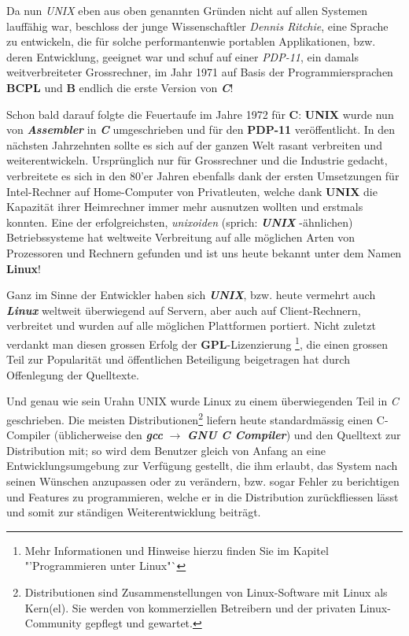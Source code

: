 \documentclass[a4paper,10pt,dvips,fleqn,titlepage,twoside]{book}
\begin{document}
Da nun \emph{UNIX} eben aus oben genannten Gründen nicht auf allen Systemen lauffähig war, beschloss der junge Wissenschaftler \emph{Dennis Ritchie}, eine Sprache zu entwickeln, die für solche performantenwie portablen Applikationen, bzw. deren Entwicklung, geeignet war und schuf auf einer \emph{PDP-11}, ein damals weitverbreiteter Grossrechner, im Jahr 1971 auf Basis der Programmiersprachen \textbf{BCPL} und \textbf{B} endlich die erste Version von \emph{\textbf{C}}!

Schon bald darauf folgte die Feuertaufe im Jahre 1972 für \textbf{C}: \textbf{UNIX} wurde nun von \emph{\textbf{Assembler}} in \emph{\textbf{C}} umgeschrieben und für den \textbf{PDP-11} veröffentlicht.\newline
In den nächsten Jahrzehnten sollte es sich auf der ganzen Welt rasant verbreiten und weiterentwickeln. Ursprünglich nur für Grossrechner und die Industrie gedacht, verbreitete es sich in den 80'er Jahren ebenfalls dank der ersten Umsetzungen für Intel-Rechner auf Home-Computer von Privatleuten, welche dank \textbf{UNIX} die Kapazität ihrer Heimrechner immer mehr ausnutzen wollten und erstmals konnten. Eine der erfolgreichsten, \textit{unixoiden} (sprich: \emph{\textbf{UNIX}	}-ähnlichen) Betriebssysteme hat weltweite Verbreitung auf alle möglichen Arten von Prozessoren und Rechnern gefunden und ist uns heute bekannt unter dem Namen \textbf{Linux}!

Ganz im Sinne der Entwickler haben sich \emph{\textbf{UNIX}}, bzw. heute vermehrt auch \emph{\textbf{Linux}} weltweit überwiegend auf Servern, aber auch auf Client-Rechnern, verbreitet und wurden auf alle möglichen Plattformen portiert. Nicht zuletzt verdankt man diesen grossen Erfolg  der \textbf{GPL}-Lizenzierung \footnote{Mehr Informationen und Hinweise hierzu finden Sie im Kapitel "'Programmieren unter Linux"`}, die einen grossen Teil zur Popularität und öffentlichen Beteiligung beigetragen hat durch Offenlegung der Quelltexte.

Und genau wie sein Urahn UNIX wurde Linux zu einem überwiegenden Teil in \emph{C} geschrieben.
Die meisten Distributionen\footnote{Distributionen sind Zusammenstellungen von Linux-Software mit Linux als Kern(el). Sie werden von kommerziellen Betreibern und der privaten Linux-Community gepflegt und gewartet.} liefern heute standardmässig einen C-Compiler (üblicherweise den \emph{\textbf{gcc}} $\rightarrow$ \emph{\textbf{GNU C Compiler}}) und den Quelltext zur Distribution mit; so wird dem Benutzer gleich von Anfang an eine Entwicklungsumgebung zur Verfügung gestellt, die ihm erlaubt, das System nach seinen Wünschen anzupassen oder zu verändern, bzw. sogar Fehler zu berichtigen und Features zu programmieren, welche er in die Distribution zurückfliessen lässt und somit zur ständigen Weiterentwicklung beiträgt.
\end{document}
